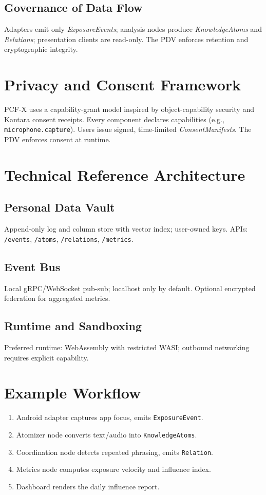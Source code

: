 \documentclass[12pt]{article}
\begin{document}
\subsection{Governance of Data Flow}
Adapters emit only \textit{ExposureEvents}; analysis nodes produce \textit{KnowledgeAtoms} and \textit{Relations}; presentation clients are read-only.  
The PDV enforces retention and cryptographic integrity.

\section{Privacy and Consent Framework}
PCF-X uses a capability-grant model inspired by object-capability security and Kantara consent receipts.  
Every component declares capabilities (e.g., \texttt{microphone.capture}).  
Users issue signed, time-limited \textit{ConsentManifests}.  
The PDV enforces consent at runtime.

\section{Technical Reference Architecture}

\subsection{Personal Data Vault}
Append-only log and column store with vector index; user-owned keys.  
APIs:  
\texttt{/events}, \texttt{/atoms}, \texttt{/relations}, \texttt{/metrics}.  

\subsection{Event Bus}
Local gRPC/WebSocket pub-sub; localhost only by default.  
Optional encrypted federation for aggregated metrics.

\subsection{Runtime and Sandboxing}
Preferred runtime: WebAssembly with restricted WASI; outbound networking requires explicit capability.

\section{Example Workflow}
\begin{enumerate}
\item Android adapter captures app focus, emits \texttt{ExposureEvent}.  
\item Atomizer node converts text/audio into \texttt{KnowledgeAtoms}.  
\item Coordination node detects repeated phrasing, emits \texttt{Relation}.  
\item Metrics node computes exposure velocity and influence index.  
\item Dashboard renders the daily influence report.
\end{enumerate}
\end{document}

